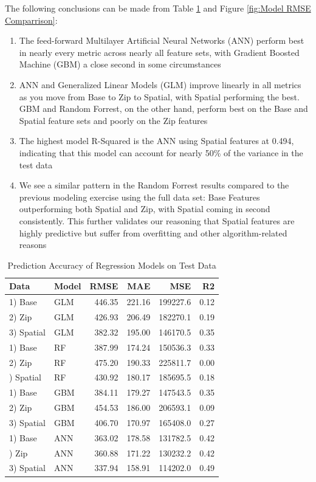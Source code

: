 \documentclass[12pt,]{article}
\providecommand{\tightlist}{%
  \setlength{\itemsep}{0pt}\setlength{\parskip}{0pt}}
\begin{document}
\noindent The following conclusions can be made from Table
\ref{tab:RegModelTable} and Figure \ref{fig:Model RMSE Comparrison}:

\begin{enumerate}
\def\labelenumi{\arabic{enumi})}
\tightlist
\item
  The feed-forward Multilayer Artificial Neural Networks (ANN) perform
  best in nearly every metric across nearly all feature sets, with
  Gradient Boosted Machine (GBM) a close second in some circumstances
\item
  ANN and Generalized Linear Models (GLM) improve linearly in all
  metrics as you move from Base to Zip to Spatial, with Spatial
  performing the best. GBM and Random Forrest, on the other hand,
  perform best on the Base and Spatial feature sets and poorly on the
  Zip features
\item
  The highest model R-Squared is the ANN using Spatial features at
  0.494, indicating that this model can account for nearly 50\% of the
  variance in the test data
\item
  We see a similar pattern in the Random Forrest results compared to the
  previous modeling exercise using the full data set: Base Features
  outperforming both Spatial and Zip, with Spatial coming in second
  consistently. This further validates our reasoning that Spatial
  features are highly predictive but suffer from overfitting and other
  algorithm-related reasons
\end{enumerate}

\begin{table}

\caption{\label{tab:Reg Model RMSE Compare}\label{tab:RegModelTable} Prediction Accuracy of Regression Models on Test Data}
\centering
\begin{tabular}[t]{llrrrr}
\toprule
Data & Model & RMSE & MAE & MSE & R2\\
\midrule
1) Base & GLM & 446.35 & 221.16 & 199227.6 & 0.12\\
2) Zip & GLM & 426.93 & 206.49 & 182270.1 & 0.19\\
3) Spatial & GLM & 382.32 & 195.00 & 146170.5 & 0.35\\
1) Base & RF & 387.99 & 174.24 & 150536.3 & 0.33\\
2) Zip & RF & 475.20 & 190.33 & 225811.7 & 0.00\\
\addlinespace
3) Spatial & RF & 430.92 & 180.17 & 185695.5 & 0.18\\
1) Base & GBM & 384.11 & 179.27 & 147543.5 & 0.35\\
2) Zip & GBM & 454.53 & 186.00 & 206593.1 & 0.09\\
3) Spatial & GBM & 406.70 & 170.97 & 165408.0 & 0.27\\
1) Base & ANN & 363.02 & 178.58 & 131782.5 & 0.42\\
\addlinespace
2) Zip & ANN & 360.88 & 171.22 & 130232.2 & 0.42\\
3) Spatial & ANN & 337.94 & 158.91 & 114202.0 & 0.49\\
\bottomrule
\end{tabular}
\end{table}
\end{document}
